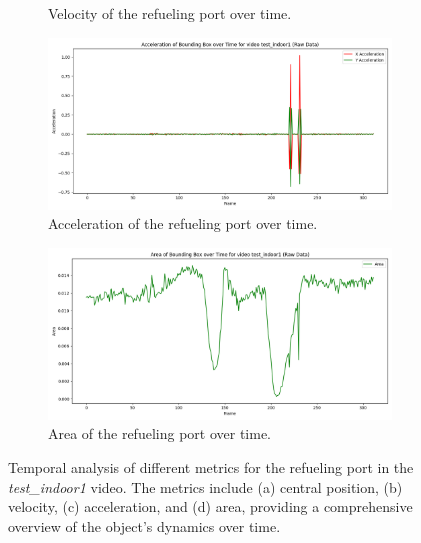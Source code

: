 \documentclass[12pt,oneside]{book} %
\begin{document}
\begin{figure}[H]
\begin{subfigure}[t]{0.6\textwidth}
        \caption{Velocity of the refueling port over time.}
        \label{fig:velocity-test-indoor1}
    \end{subfigure}
    \vfill
    \begin{subfigure}[t]{0.6\textwidth}
        \includegraphics[width=\textwidth]{figures/bbox_metrics/test_indoor1 (Raw Data)_acceleration.png}
        \caption{Acceleration of the refueling port over time.}
        \label{fig:acceleration-test-indoor1}
    \end{subfigure}
    \hfill
    \begin{subfigure}[t]{0.6\textwidth}
        \includegraphics[width=\textwidth]{figures/bbox_metrics/test_indoor1 (Raw Data)_area.png}
        \caption{Area of the refueling port over time.}
        \label{fig:size-test-indoor1}
    \end{subfigure}
    \caption{Temporal analysis of different metrics for the refueling port in the \textit{test\_indoor1} video. The metrics include (a) central position, (b) velocity, (c) acceleration, and (d) area, providing a comprehensive overview of the object's dynamics over time.}
    \label{fig:bbox-metrics-test-indoor1}
\end{figure}
\end{document}

